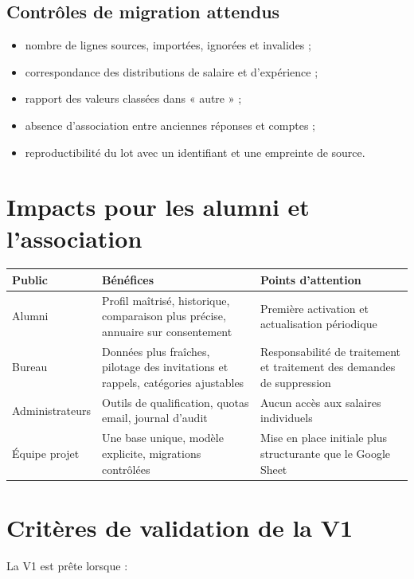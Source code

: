 \documentclass[11pt,a4paper]{article}
\begin{document}
\subsection{Contrôles de migration attendus}

\begin{itemize}
  \item nombre de lignes sources, importées, ignorées et invalides ;
  \item correspondance des distributions de salaire et d'expérience ;
  \item rapport des valeurs classées dans « autre » ;
  \item absence d'association entre anciennes réponses et comptes ;
  \item reproductibilité du lot avec un identifiant et une empreinte de source.
\end{itemize}

\section{Impacts pour les alumni et l'association}

\begin{tabularx}{\textwidth}{@{}L{42mm}YY@{}}
  \toprule
  \textbf{Public} & \textbf{Bénéfices} & \textbf{Points d'attention} \\
  \midrule
  Alumni & Profil maîtrisé, historique, comparaison plus précise, annuaire sur consentement & Première activation et actualisation périodique \\
  Bureau & Données plus fraîches, pilotage des invitations et rappels, catégories ajustables & Responsabilité de traitement et traitement des demandes de suppression \\
  Administrateurs & Outils de qualification, quotas email, journal d'audit & Aucun accès aux salaires individuels \\
  Équipe projet & Une base unique, modèle explicite, migrations contrôlées & Mise en place initiale plus structurante que le Google Sheet \\
  \bottomrule
\end{tabularx}

\section{Critères de validation de la V1}

La V1 est prête lorsque :
\end{document}
